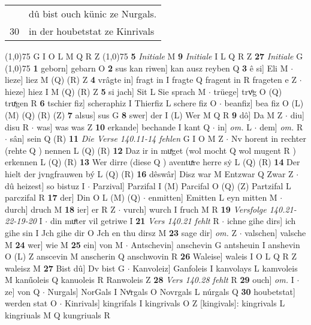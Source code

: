 \documentclass[8pt,a4paper,notitlepage]{article}
\begin{document}
\begin{table}[ht]
\begin{minipage}[t]{0.5\linewidth}
\begin{tabular}{rl}
 & dû bist ouch künic ze Nurgals.\\ 
30 & in der houbetstat ze Kinrivals\\ 
\end{tabular}
\scriptsize
\line(1,0){75} \newline
G I O L M Q R Z \newline
\line(1,0){75} \newline
\textbf{5} \textit{Initiale} M  \textbf{9} \textit{Initiale} I L Q R Z  \textbf{27} \textit{Initiale} G  \newline
\line(1,0){75} \newline
\textbf{1} geborn] gebarn O \textbf{2} sus kan riwen] kan ausz reyben Q \textbf{3} ê si] Eli M  $\cdot$ lieze] liez M (Q) (R) Z \textbf{4} vrâgte in] fragt in I fragte Q fragent in R frageten e Z  $\cdot$ hieze] hiez I M (Q) (R) Z \textbf{5} si jach] Sit L Sie sprach M  $\cdot$ trüege] trvͦg O (Q) truͯgen R \textbf{6} tschier fiz] scheraphiz I Thierfiz L schere fiz O  $\cdot$ beanfiz] bea fiz O (L) (M) (Q) (R) (Z) \textbf{7} alsus] sus G \textbf{8} swer] der I (L) Wer M Q R \textbf{9} dô] Da M Z  $\cdot$ diu] disu R  $\cdot$ was] was was Z \textbf{10} erkande] bechande I kant Q  $\cdot$ in] \textit{om.} L  $\cdot$ dem] \textit{om.} R  $\cdot$ sân] sein Q (R) \textbf{11} \textit{Die Verse 140.11-14 fehlen} G I O M Z   $\cdot$ Nv horent in rechter (rehte Q ) nennen L (Q) (R) \textbf{12} Daz ir in muͯget (wol mocht Q wol mugent R ) erkennen L (Q) (R) \textbf{13} Wer dirre (diese Q ) aventuͯre herre sẏ L (Q) (R) \textbf{14} Der hielt der jvngfrauwen bý L (Q) (R) \textbf{16} dêswâr] Disz war M Entzwar Q Zwar Z  $\cdot$ dû heizest] so bistuz I  $\cdot$ Parzival] Parzifal I (M) Parcifal O (Q) (Z) Partzifal L parczifal R \textbf{17} der] Din O L (M) (Q)  $\cdot$ enmitten] Emitten L eyn mitten M  $\cdot$ durch] druch M \textbf{18} ier] er R Z  $\cdot$ vurch] wurch I fruch M R \textbf{19} \textit{Versfolge 140.21-22-19-20} I   $\cdot$ din muͤter vil getriwe I \textbf{21} \textit{Vers 140.21 fehlt} R   $\cdot$ ichne gihe dirs] ich gihe sin I Jch gihe dir O Jch en thu dirsz M \textbf{23} sage dir] \textit{om.} Z  $\cdot$ valschen] valsche M \textbf{24} wer] wie M \textbf{25} ein] von M  $\cdot$ Antschevin] anschevin G antsheuin I anshevin O (L) Z anscevin M anscherin Q anschwovin R \textbf{26} Waleise] waleis I O L Q R Z waleisz M \textbf{27} Bist dû] Dv bist G  $\cdot$ Kanvoleiz] Ganfoleis I kanvolays L kamvoleis M kanűoleis Q kanuoleis R Ranwoleis Z \textbf{28} \textit{Vers 140.28 fehlt} R  \textbf{29} ouch] \textit{om.} I  $\cdot$ ze] von Q  $\cdot$ Nurgals] NorGals I Nvͦrgals O Novrgals L núrgals Q \textbf{30} houbetstat] werden stat O  $\cdot$ Kinrivals] kingrifals I kingrivals O Z [kingivals]: kingrivals L kingriuals M Q kungriuals R \newline

\end{minipage}
\end{table}
\end{document}
